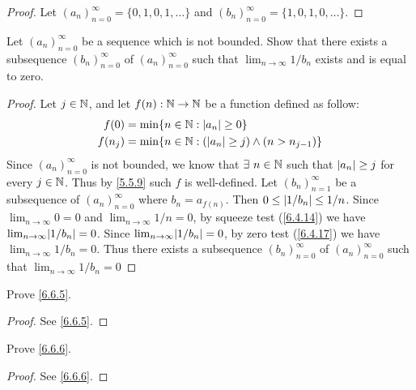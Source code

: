\begin{proof}
  Let \((a_n)_{n = 0}^\infty = \{0, 1, 0, 1, \dots\}\) and \((b_n)_{n = 0}^\infty = \{1, 0, 1, 0, \dots\}\).
\end{proof}

\begin{ex}\label{ex:6.6.3}
  Let \((a_n)_{n = 0}^\infty\) be a sequence which is not bounded.
  Show that there exists a subsequence \((b_n)_{n = 0}^\infty\) of \((a_n)_{n = 0}^\infty\) such that \(\lim_{n \to \infty} 1 / b_n\) exists and is equal to zero.
\end{ex}

\begin{proof}
  Let \(j \in \mathbb{N}\), and let \(f(n) : \mathbb{N} \to \mathbb{N}\) be a function defined as follow:
  \begin{align*}
    f(0)   & = \min\{n \in \mathbb{N} : \left\lvert a_n\right\rvert \geq 0\}                         \\
    f(n_j) & = \min\{n \in \mathbb{N} : (\left\lvert a_n\right\rvert \geq j) \land (n > n_{j - 1})\}
  \end{align*}
  Since \((a_n)_{n = 0}^\infty\) is not bounded, we know that \(\exists\ n \in \mathbb{N}\) such that \(\left\lvert a_n\right\rvert \geq j\) for every \(j \in \mathbb{N}\).
  Thus by \cref{5.5.9} such \(f\) is well-defined.
  Let \((b_n)_{n = 1}^\infty\) be a subsequence of \((a_n)_{n = 0}^\infty\) where \(b_n = a_{f(n)}\).
  Then \(0 \leq \left\lvert1 / b_n\right\rvert \leq 1 / n\).
  Since \(\lim_{n \to \infty} 0 = 0\) and \(\lim_{n \to \infty} 1 / n = 0\), by squeeze test (\cref{6.4.14}) we have \(\lim_{n \to \infty} \abs{1 / b_n} = 0\).
  Since \(\lim_{n \to \infty} \abs{1 / b_n} = 0\), by zero test (\cref{6.4.17}) we have \(\lim_{n \to \infty} 1 / b_n = 0\).
  Thus there exists a subsequence \((b_n)_{n = 0}^\infty\) of \((a_n)_{n = 0}^\infty\) such that \(\lim_{n \to \infty} 1 / b_n = 0\)
\end{proof}

\begin{ex}\label{ex:6.6.4}
  Prove \cref{6.6.5}.
\end{ex}

\begin{proof}
  See \cref{6.6.5}.
\end{proof}

\begin{ex}\label{ex:6.6.5}
  Prove \cref{6.6.6}.
\end{ex}

\begin{proof}
  See \cref{6.6.6}.
\end{proof}